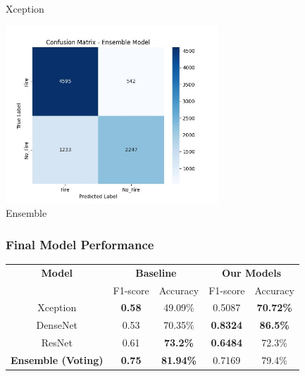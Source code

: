\begin{frame}
\begin{minipage}[c]{0.5\textwidth}
        Xception
    \end{minipage}%
    \begin{minipage}[c]{0.5\textwidth}
        \centering
        \includegraphics[width=0.6\textwidth]{images/ensemble}\\
        Ensemble
    \end{minipage}
\end{frame}

\begin{frame}
    \frametitle{Final Model Performance}
    \begin{center}
        \renewcommand{\arraystretch}{1.2}
        \begin{tabular}{|c|c|c|c|c|}
            \hline
            \textbf{Model} & \multicolumn{2}{c|}{\textbf{Baseline}} & \multicolumn{2}{c|}{\textbf{Our Models}} \\
            \cline{2-5}
            & F1-score & Accuracy & F1-score & Accuracy \\
            \hline
            Xception & \textbf{0.58} & 49.09\% & 0.5087 & \textbf{70.72\%} \\
            DenseNet & 0.53 & 70.35\% & \textbf{0.8324} & \textbf{86.5\%} \\
            ResNet & 0.61 & \textbf{73.2\%} & \textbf{0.6484} & 72.3\% \\
            \hline
            \textbf{Ensemble (Voting)} & \textbf{0.75} & \textbf{81.94\%} & 0.7169 & 79.4\% \\
            \hline
        \end{tabular}
    \end{center}
\end{frame}
